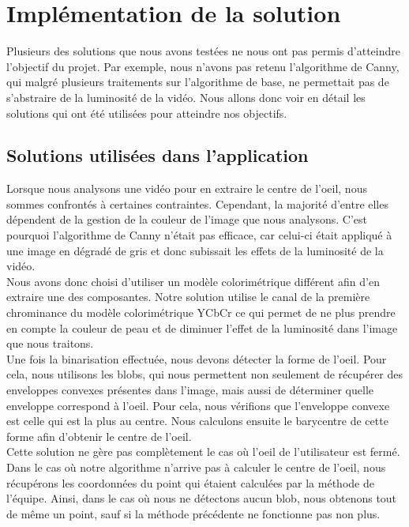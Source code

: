 \section{Implémentation de la solution}
Plusieurs des solutions que nous avons testées ne nous ont pas permis d'atteindre l'objectif du projet.
Par exemple, nous n'avons pas retenu l'algorithme de Canny, qui malgré plusieurs traitements sur l'algorithme
de base, ne permettait pas de s'abstraire de la luminosité de la vidéo.
Nous allons donc voir en détail les solutions qui ont été utilisées pour atteindre nos objectifs.

\subsection{Solutions utilisées dans l'application}
Lorsque nous analysons une vidéo pour en extraire le centre de l'oeil, nous sommes confrontés à certaines contraintes.
Cependant, la majorité d'entre elles dépendent de la gestion de la couleur de l'image que nous analysons. C'est
pourquoi l'algorithme de Canny n'était pas efficace, car celui-ci était appliqué à une image en dégradé de gris
et donc subissait les effets de la luminosité de la vidéo.\\

Nous avons donc choisi d'utiliser un modèle colorimétrique différent afin d'en extraire une des composantes.
Notre solution utilise le canal de la première chrominance du modèle colorimétrique YCbCr ce qui permet 
de ne plus prendre en compte la couleur de peau et de diminuer l'effet de la luminosité dans l'image que nous traitons.\\


Une fois la binarisation effectuée, nous devons détecter la forme de l'oeil. Pour cela, nous utilisons les blobs, qui nous
permettent non seulement de récupérer des enveloppes convexes présentes dans l'image, mais aussi de déterminer quelle enveloppe
correspond à l'oeil. Pour cela, nous vérifions que l'enveloppe convexe est celle qui est la plus au centre.
Nous calculons ensuite le barycentre de cette forme afin d'obtenir le centre de l'oeil.\\

Cette solution ne gère pas complètement le cas où l'oeil de l'utilisateur est fermé. Dans le cas où notre algorithme
n'arrive pas à calculer le centre de l'oeil, nous récupérons les coordonnées du point qui étaient calculées par la méthode 
de l'équipe. Ainsi, dans le cas où nous ne détectons aucun blob, nous obtenons tout de même un point, sauf si la méthode 
précédente ne fonctionne pas non plus.

